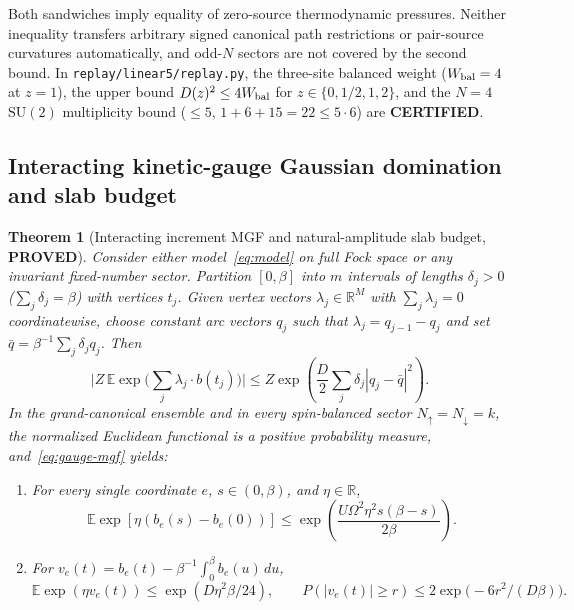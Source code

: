 \documentclass[11pt]{article}
\newtheorem{theorem}{Theorem}
\theoremstyle{remark}
\newcommand{\proved}{\textbf{PROVED}}
\newcommand{\certified}{\textbf{CERTIFIED}}
\begin{document}
Both sandwiches imply equality of zero-source thermodynamic pressures. Neither inequality transfers arbitrary signed canonical path restrictions or pair-source curvatures automatically, and odd-$N$ sectors are not covered by the second bound. In \texttt{replay/linear5/replay.py}, the three-site balanced weight ($W_{\rm bal}=4$ at $z=1$), the upper bound $D(z)^2\le 4W_{\rm bal}$ for $z\in\{0,1/2,1,2\}$, and the $N=4$ $\mathrm{SU}(2)$ multiplicity bound ($\le 5$, $1+6+15=22\le 5\cdot 6$) are \certified{}.

\subsection{Interacting kinetic-gauge Gaussian domination and slab budget}

\begin{theorem}[Interacting increment MGF and natural-amplitude slab budget, \proved]\label{thm:slab}
Consider either model~\eqref{eq:model} on full Fock space or any invariant fixed-number sector. Partition $[0,\beta]$ into $m$ intervals of lengths $\delta_j>0$ ($\sum_j\delta_j=\beta$) with vertices $t_j$. Given vertex vectors $\lambda_j\in\mathbb R^M$ with $\sum_j\lambda_j=0$ coordinatewise, choose constant arc vectors $q_j$ such that $\lambda_j=q_{j-1}-q_j$ and set $\bar q=\beta^{-1}\sum_j \delta_j q_j$. Then
\begin{equation}\label{eq:gauge-mgf}
 \bigl|Z\,\mathbb E\exp\!\bigl(\sum_j \lambda_j\cdot b(t_j)\bigr)\bigr|
 \le Z\exp\!\left(\frac{D}{2}\sum_j \delta_j |q_j-\bar q|^2\right).
\end{equation}
In the grand-canonical ensemble and in every spin-balanced sector $N_\uparrow=N_\downarrow=k$, the normalized Euclidean functional is a positive probability measure, and~\eqref{eq:gauge-mgf} yields:
\begin{enumerate}
\item[(a)] For every single coordinate $e$, $s\in(0,\beta)$, and $\eta\in\mathbb R$,
\begin{equation}\label{eq:inc-mgf}
 \mathbb E\exp[\eta(b_e(s)-b_e(0))] \le \exp\!\left(\frac{U\Omega^2\eta^2 s(\beta-s)}{2\beta}\right).
\end{equation}
\item[(b)] For $v_e(t)=b_e(t)-\beta^{-1}\int_0^\beta b_e(u)\,du$,
\begin{equation}\label{eq:proj-tail}
 \mathbb E\exp(\eta v_e(t))\le \exp(D\eta^2\beta/24),\qquad
 P(|v_e(t)|\ge r)\le 2\exp\!\bigl(-6r^2/(D\beta)\bigr).
\end{equation}

\end{enumerate}
\end{theorem}
\end{document}
